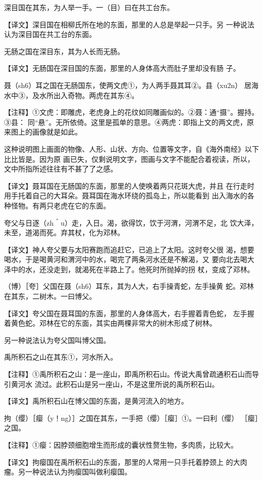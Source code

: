 \documentclass[a4paper,12pt,UTF8,twoside]{ctexbook}
\begin{document}
深目国在其东，为人举一手。一（目）曰在共工台东。

【译文】深目国在相柳氏所在地的东面，那里的人总是举起一只手。另 一种说法认为深目国在共工台的东面。

无肠之国在深目东，其为人长而无肠。

【译文】无肠国在深目国的东面，那里的人身体高大而肚子里却没有肠 子。

聂（sh6）耳之国在无肠国东，使两文虎①，为人两手聂其耳②。县（xu2n） 居海水中③，及水所出入奇物。两虎在其东④。

【注释】①文虎：即雕虎，老虎身上的花纹如同雕画似的。②聂：通“摄”。握持。③县： 同“悬”。无所依倚。这里是孤单的意思。④两虎：即指上文的两文虎，原来图上的画像就是如此。

这种说明图上画面的物像、人形、山状、方向、位置等文字，自《海外南经》以下比比皆是。因为原 画已失，仅剩说明文字，图画与文字不能配合着视读，所以，文中所指所述往往有不甚了了之感。

【译文】聂耳国在无肠国的东面，那里的人使唤着两只花斑大虎，并且 在行走时用手托着自己的大耳朵。聂耳国在海水环绕的孤岛上，所以能看到 出入海水的各种怪物。有两只老虎在它的东面。

夸父与日逐（zh＾u）走，入日。渴，欲得饮，饮于河渭，河渭不足，北 饮大泽，未至，道渴而死。弃其杖，化为邓林。

【译文】神人夸父要与太阳赛跑而追赶它，已追上了太阳。这时夸父很 渴，想要喝水，于是喝黄河和渭河中的水，喝完了两条河水还是不解渴，又 要向北去喝大泽中的水，还没走到，就渴死在半路上了。他死时所抛掉的拐 杖，变成了邓林。

（博）［夸］父国在聂（sh6）耳东，其为人大，右手操青蛇，左手操黄 蛇。邓林在其东，二树木。一曰博父。

【译文】夸父国在聂耳国的东面，那里的人身体高大，右手握着青色蛇， 左手握着黄色蛇。邓林在它的东面，其实由两棵非常大的树木形成了树林。

另一种说法认为夸父国叫博父国。

禹所积石之山在其东①，河水所入。

【注释】①禹所积石之山：是一座山，即禹所积石山。传说大禹曾疏通积石山而导引黄河水 流过。此积石山是另一座山，不是这里所说的禹所积石山。

【译文】禹所积石山在博父国的东面，是黄河流入的地方。

拘（缨）［瘿（y！ng）］之国在其东，一手把（缨）［瘿］①。一曰利（缨） ［瘿］之国。

【注释】①瘿：因脖颈细胞增生而形成的囊状性赘生物，多肉质，比较大。

【译文】拘瘿国在禹所积石山的东面，那里的人常用一只手托着脖颈上 的大肉瘤。另一种说法认为拘瘿国叫做利瘿国。
\end{document}
